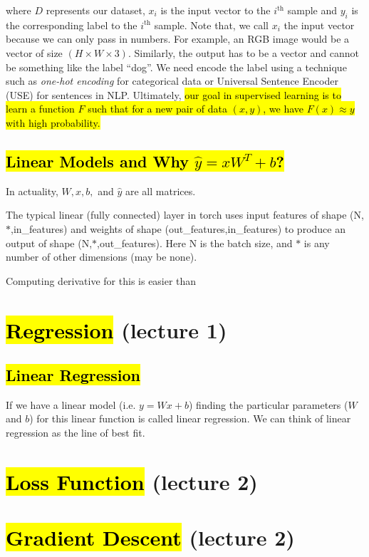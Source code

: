 \documentclass[11pt]{article}
\newcommand{\hlinfo}[1]{{\sethlcolor{lavender}\hl{#1}}}
\begin{document}
where $D$ represents our dataset, $x_i$ is the input vector to the $i^{\text{th}}$ sample and $y_i$ is the corresponding label to the $i^{\text{th}}$ sample. Note that, we call $x_i$ the input vector because we can only pass in numbers. For example, an RGB image would be a vector of size $(H \times W \times 3)$. Similarly, the output has to be a vector and cannot be something like the label ``dog''. We need encode the label using a technique such as \emph{one-hot encoding} for categorical data or Universal Sentence Encoder (USE) for sentences in NLP. Ultimately, \hlinfo{our goal in supervised learning is to learn a function $F$ such that for a new pair of data $(x, y)$, we have $F(x) \approx y$ with high probability.}

\subsection{\hl{Linear Models and Why $\hat{y} = xW^{T} + b$?}}
\label{section:linearconvention}

In actuality, $W, x, b,$ and $\hat{y}$ are all matrices. 


The typical linear (fully connected) layer in torch uses input features of shape (N,$\ast$,in\_features) and weights of shape (out\_features,in\_features) to produce an output of shape (N,$\ast$,out\_features). Here N is the batch size, and $\ast$ is any number of other dimensions (may be none). 

Computing derivative for this is easier than 


\section{\hl{Regression} (lecture 1)}

\subsection{\hl{Linear Regression}}

If we have a linear model (i.e. $y=Wx+b$) finding the particular parameters ($W$ and $b$) for this linear function is called linear regression. We can think of linear regression as the line of best fit. 

\section{\hl{Loss Function} (lecture 2)}

\section{\hl{Gradient Descent} (lecture 2)}
\end{document}
